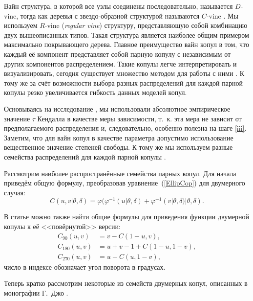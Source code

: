 Вайн структура, в которой все узлы соединены последовательно, называется $D$-vine, тогда как деревья с звездо-образной структурой называются $C$-vine \cite{Dissmann2013}. 
Мы используем $R$-vine (\textit{regular vine}) структуру, представляющую собой комбинацию двух вышеописанных типов. 
Такая структура является наиболее общим примером максимально покрывающего дерева.
Главное преимущество вайн копул в том, что каждый её компонент представляет собой парную копулу с независимым от других компонентов распределением.
Такие копулы легче интерпретировать и визуализировать, сегодня существует множество методом для работы с ними \cite{Cooke2015, Czado2010, Dissmann2013}. 
К тому же за счёт возможности выбора разных распределений для каждой парной копулы резко увеличивается гибкость данных моделей копул.

Основываясь на исследование \cite{Dissmann2013}, мы использовали абсолютное эмпирическое значение $\tau$ Кендалла в качестве меры зависимости, т.~к. эта мера не зависит от предполагаемого распределения и, следовательно, особенно полезна на шаге \ref{iii}.
Заметим, что для вайн копул в качестве параметра допустимо использование вещественное значение степеней свободы. %
К тому же мы используем разные семейства распределений для каждой парной копулы \cite{Bel2010}.

Рассмотрим наиболее распространённые семейства парных копул. 
Для начала приведём общую формулу, преобразовав уравнение~(\ref{EllipCop}) для двумерного случая:
\begin{equation} \label{BiArch}
    C(u,v|\theta,\delta) = \varphi (\varphi^{-1}(u|\theta,\delta) + \varphi^{-1}(v|\theta,\delta)|\theta,\delta).
\end{equation}

В статье \cite{Brechmann2013} можно также найти общие формулы для приведения функции двумерной копулы к её <<повёрнутой>> версии:
\begin{equation} \label{rotatedCop}
\begin{aligned}
    C_{90}(u,v) &= v - C(1 - u, v), \\
    C_{180}(u,v) &= u + v - 1 + C(1 - u,1 - v), \\
    C_{270}(u, v) &= u - C(u, 1 - v),
\end{aligned}
\end{equation}
число в индексе обозначает угол поворота в градусах.

Теперь кратко рассмотрим некоторые из семейств двумерных копул, описанных в монографии Г.~Джо \cite{Joe1997}.


